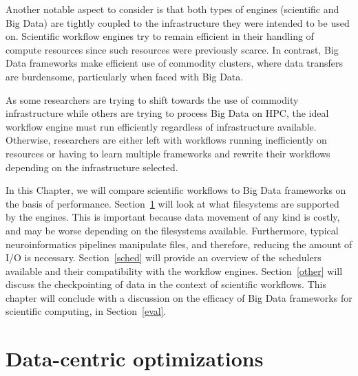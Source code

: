 \documentclass{report}
\begin{document}
        Another notable aspect to consider is that both types of engines 
        (scientific and Big Data) are tightly coupled to the infrastructure
        they were intended to be used on. Scientific workflow engines
        try to remain efficient in their handling of compute resources since such
        resources were previously scarce. In contrast, Big Data frameworks 
        make efficient use of commodity clusters, where data transfers are 
        burdensome, particularly when faced with Big Data.

        As some researchers are trying to shift towards the use of commodity 
        infrastructure while others are trying to process Big Data on HPC, the 
        ideal workflow engine must run efficiently regardless of 
        infrastructure available. Otherwise, researchers are either left with
        workflows running inefficiently on resources or having to learn 
        multiple frameworks and rewrite their workflows depending on the 
        infrastructure selected.
 
        In this Chapter, we will compare scientific
        workflows to Big Data frameworks on the basis of performance. 
        Section~\ref{fs} will look at what filesystems are supported by the 
        engines. This is important because data movement of any kind is costly,
        and may be worse depending on the filesystems available. Furthermore, 
        typical neuroinformatics pipelines manipulate files, and therefore, 
        reducing the amount of I/O is necessary.
        Section~\ref{sched} will provide an overview of the schedulers 
        available and their compatibility with the workflow engines. 
        Section~\ref{other} will discuss the checkpointing of data in the context
        of scientific workflows. This chapter will conclude with a discussion
        on the efficacy of Big Data frameworks for scientific computing, in
        Section~\ref{eval}.
        
 
        \section{Data-centric optimizations}\label{fs}
            
\end{document}
